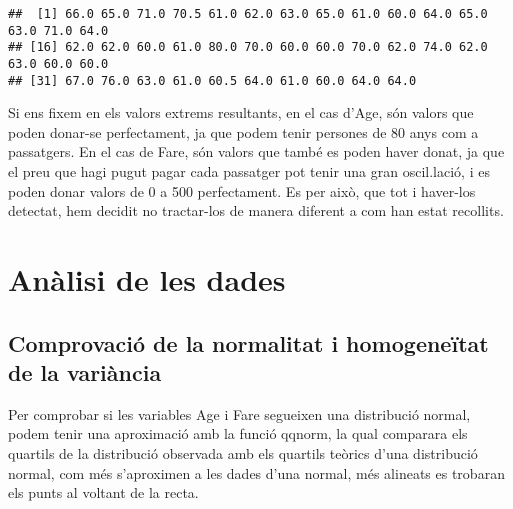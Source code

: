 \documentclass[]{article}
\newenvironment{Shaded}{\begin{snugshade}}{\end{snugshade}}
\newcommand{\CommentTok}[1]{\textcolor[rgb]{0.56,0.35,0.01}{\textit{#1}}}
\newcommand{\DataTypeTok}[1]{\textcolor[rgb]{0.13,0.29,0.53}{#1}}
\newcommand{\DecValTok}[1]{\textcolor[rgb]{0.00,0.00,0.81}{#1}}
\newcommand{\KeywordTok}[1]{\textcolor[rgb]{0.13,0.29,0.53}{\textbf{#1}}}
\newcommand{\NormalTok}[1]{#1}
\newcommand{\OperatorTok}[1]{\textcolor[rgb]{0.81,0.36,0.00}{\textbf{#1}}}
\newcommand{\StringTok}[1]{\textcolor[rgb]{0.31,0.60,0.02}{#1}}
\begin{document}
\begin{verbatim}
##  [1] 66.0 65.0 71.0 70.5 61.0 62.0 63.0 65.0 61.0 60.0 64.0 65.0 63.0 71.0 64.0
## [16] 62.0 62.0 60.0 61.0 80.0 70.0 60.0 60.0 70.0 62.0 74.0 62.0 63.0 60.0 60.0
## [31] 67.0 76.0 63.0 61.0 60.5 64.0 61.0 60.0 64.0 64.0
\end{verbatim}

Si ens fixem en els valors extrems resultants, en el cas d'Age, són
valors que poden donar-se perfectament, ja que podem tenir persones de
80 anys com a passatgers. En el cas de Fare, són valors que també es
poden haver donat, ja que el preu que hagi pugut pagar cada passatger
pot tenir una gran oscil.lació, i es poden donar valors de 0 a 500
perfectament. Es per això, que tot i haver-los detectat, hem decidit no
tractar-los de manera diferent a com han estat recollits.

\hypertarget{anuxe0lisi-de-les-dades}{%
\section{Anàlisi de les dades}\label{anuxe0lisi-de-les-dades}}

\hypertarget{comprovaciuxf3-de-la-normalitat-i-homogeneuxeftat-de-la-variuxe0ncia}{%
\subsection{Comprovació de la normalitat i homogeneïtat de la
variància}\label{comprovaciuxf3-de-la-normalitat-i-homogeneuxeftat-de-la-variuxe0ncia}}

Per comprobar si les variables Age i Fare segueixen una distribució
normal, podem tenir una aproximació amb la funció qqnorm, la qual
comparara els quartils de la distribució observada amb els quartils
teòrics d'una distribució normal, com més s'aproximen a les dades d'una
normal, més alineats es trobaran els punts al voltant de la recta.

\begin{Shaded}
\end{Shaded}
\end{document}
